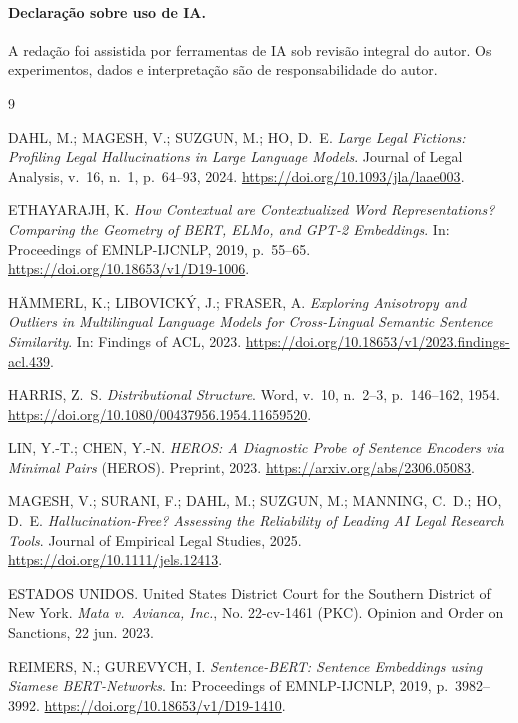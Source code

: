 \documentclass[11pt]{article}
\begin{document}
\paragraph{Declaração sobre uso de IA.} A redação foi assistida por ferramentas de
IA sob revisão integral do autor. Os experimentos, dados e interpretação são de
responsabilidade do autor.

\begin{thebibliography}{9}
\small

DAHL, M.; MAGESH, V.; SUZGUN, M.; HO, D.~E.
\emph{Large Legal Fictions: Profiling Legal Hallucinations in Large Language
Models}. Journal of Legal Analysis, v.~16, n.~1, p.~64--93, 2024.
\url{https://doi.org/10.1093/jla/laae003}.

ETHAYARAJH, K.
\emph{How Contextual are Contextualized Word Representations? Comparing the
Geometry of BERT, ELMo, and GPT-2 Embeddings}. In: Proceedings of EMNLP-IJCNLP,
2019, p.~55--65. \url{https://doi.org/10.18653/v1/D19-1006}.

HÄMMERL, K.; LIBOVICKÝ, J.; FRASER, A.
\emph{Exploring Anisotropy and Outliers in Multilingual Language Models for
Cross-Lingual Semantic Sentence Similarity}. In: Findings of ACL, 2023.
\url{https://doi.org/10.18653/v1/2023.findings-acl.439}.

HARRIS, Z.~S.
\emph{Distributional Structure}. Word, v.~10, n.~2--3, p.~146--162, 1954.
\url{https://doi.org/10.1080/00437956.1954.11659520}.

LIN, Y.-T.; CHEN, Y.-N.
\emph{HEROS: A Diagnostic Probe of Sentence Encoders via Minimal Pairs} (HEROS).
Preprint, 2023. \url{https://arxiv.org/abs/2306.05083}.

MAGESH, V.; SURANI, F.; DAHL, M.; SUZGUN, M.; MANNING, C.~D.; HO, D.~E.
\emph{Hallucination-Free? Assessing the Reliability of Leading AI Legal Research
Tools}. Journal of Empirical Legal Studies, 2025.
\url{https://doi.org/10.1111/jels.12413}.

ESTADOS UNIDOS. United States District Court for the Southern District of New
York. \emph{Mata v.\ Avianca, Inc.}, No. 22-cv-1461 (PKC). Opinion and Order on
Sanctions, 22 jun. 2023.

REIMERS, N.; GUREVYCH, I.
\emph{Sentence-BERT: Sentence Embeddings using Siamese BERT-Networks}. In:
Proceedings of EMNLP-IJCNLP, 2019, p.~3982--3992.
\url{https://doi.org/10.18653/v1/D19-1410}.

\end{thebibliography}
\end{document}
